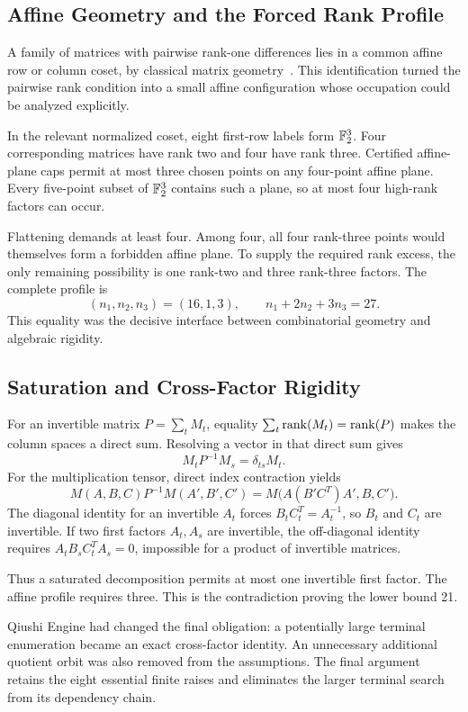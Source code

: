\subsection{Affine Geometry and the Forced Rank Profile}\label{route:geometry}

A family of matrices with pairwise rank-one differences lies in a
common affine row or column coset, by classical matrix
geometry~\cite{hua1945geometries,wan1996geometry}. This identification
turned the pairwise rank condition into a small affine configuration
whose occupation could be analyzed explicitly.

In the relevant normalized coset, eight first-row labels form
$\mathbb{F}_2^3$. Four corresponding matrices have rank two and four have
rank three. Certified affine-plane caps permit at most three chosen
points on any four-point affine plane. Every five-point subset of
$\mathbb{F}_2^3$ contains such a plane, so at most four high-rank factors
can occur.

Flattening demands at least four. Among four, all four rank-three
points would themselves form a forbidden affine plane. To supply
the required rank excess, the only remaining possibility is
one rank-two and three rank-three factors. The complete profile is
\[
 (n_1,n_2,n_3)=(16,1,3),\qquad
 n_1+2n_2+3n_3=27.
\]
This equality was the decisive interface between combinatorial
geometry and algebraic rigidity.

\subsection{Saturation and Cross-Factor Rigidity}\label{route:saturation}

For an invertible matrix $P=\sum_t M_t$, equality
$\sum_t\operatorname{rank}(M_t)=\operatorname{rank}(P)$ makes the column spaces a direct sum.
Resolving a vector in that direct sum gives
\[
 M_tP^{-1}M_s=\delta_{ts}M_t.
\]
For the multiplication tensor, direct index contraction yields
\[
 M(A,B,C)P^{-1}M(A',B',C')
   =M\bigl(A(B'C^T)A',B,C'\bigr).
\]
The diagonal identity for an invertible $A_t$ forces
$B_tC_t^T=A_t^{-1}$, so $B_t$ and $C_t$ are invertible.
If two first factors $A_t,A_s$ are invertible, the off-diagonal
identity requires $A_tB_sC_t^TA_s=0$, impossible for a product
of invertible matrices.

Thus a saturated decomposition permits at most one invertible
first factor. The affine profile requires three. This is the
contradiction proving the lower bound 21.

Qiushi Engine had changed the final obligation: a potentially large
terminal enumeration became an exact cross-factor identity. An unnecessary
additional quotient orbit was also removed from the assumptions.
The final argument retains the eight essential finite raises
and eliminates the larger terminal search from its dependency chain.

